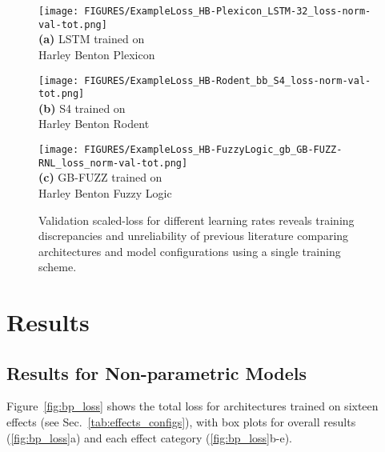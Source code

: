 \begin{figure*}[t]
    \begin{minipage}[b]{.32\textwidth}
        \centering
        \texttt{[image: FIGURES/ExampleLoss\_HB-Plexicon\_LSTM-32\_loss-norm-val-tot.png]}
        \\\textbf{(a)} LSTM trained on\\Harley Benton Plexicon
        \label{fig:ex_loss_lstm}
    \end{minipage}
    \begin{minipage}[b]{.32\textwidth}
        \centering
        \texttt{[image: FIGURES/ExampleLoss\_HB-Rodent\_bb\_S4\_loss-norm-val-tot.png]}
        \\\textbf{(b)} S4 trained on\\Harley Benton Rodent
        \label{fig:ex_loss_s4}
    \end{minipage}
    \begin{minipage}[b]{.32\textwidth}
        \centering
        \texttt{[image: FIGURES/ExampleLoss\_HB-FuzzyLogic\_gb\_GB-FUZZ-RNL\_loss\_norm-val-tot.png]}
        \\\textbf{(c)} GB-FUZZ trained on\\Harley Benton Fuzzy Logic
        \label{fig:ex_loss_gb}
    \end{minipage}
    \caption{Validation scaled-loss for different learning rates reveals training discrepancies and unreliability of previous literature comparing architectures and model configurations using a single training scheme.}
    \label{fig:example_loss_variance}
\end{figure*}

\section{Results}
\label{sec:results}

\subsection{Results for Non-parametric Models}
\label{sec:results_overall}
Figure~\ref{fig:bp_loss} shows the total loss for architectures trained on sixteen effects (see Sec.~\ref{tab:effects_configs}), with box plots for overall results (\ref{fig:bp_loss}a) and each effect category (\ref{fig:bp_loss}b-e).

